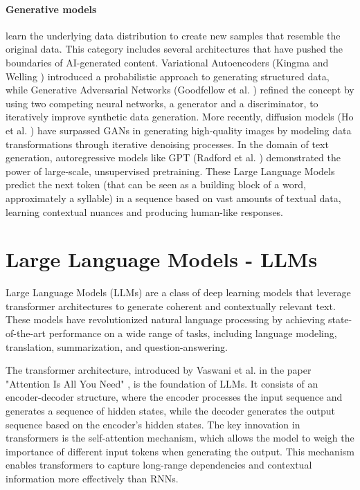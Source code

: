 \paragraph{Generative models}
learn the underlying data distribution to create new samples that resemble the original
data. This category includes several architectures that have pushed the
boundaries of AI-generated content. Variational Autoencoders (Kingma and Welling
\cite{kingma2022autoencodingvariationalbayes}) introduced a probabilistic approach
to generating structured data, while Generative Adversarial Networks (Goodfellow
et al. \cite{goodfellow2014generativeadversarialnetworks}) refined the concept by
using two competing neural networks, a generator and a discriminator, to iteratively
improve synthetic data generation. More recently, diffusion models (Ho et al. \cite{ho2020denoisingdiffusionprobabilisticmodels})
have surpassed GANs in generating high-quality images by modeling data
transformations through iterative denoising processes. In the domain of text generation,
autoregressive models like GPT (Radford et al. \cite{radford2018improving}) demonstrated
the power of large-scale, unsupervised pretraining. These Large Language Models predict
the next token (that can be seen as a building block of a word, approximately a syllable)
in a sequence based on vast amounts of textual data, learning contextual nuances
and producing human-like responses.

\section{Large Language Models - LLMs}
\label{sec:large_language_models_llms}

Large Language Models (LLMs) are a class of deep learning models that leverage
transformer architectures to generate coherent and contextually relevant text. These
models have revolutionized natural language processing by achieving state-of-the-art
performance on a wide range of tasks, including language modeling, translation,
summarization, and question-answering.

The transformer architecture, introduced by Vaswani et al. in the paper "Attention
Is All You Need" \cite{vaswani2023attentionneed}, is the foundation of LLMs. It consists
of an encoder-decoder structure, where the encoder processes the input sequence
and generates a sequence of hidden states, while the decoder generates the output
sequence based on the encoder's hidden states. The key innovation in
transformers is the self-attention mechanism, which allows the model to weigh the
importance of different input tokens when generating the output. This mechanism
enables transformers to capture long-range dependencies and contextual
information more effectively than RNNs.

